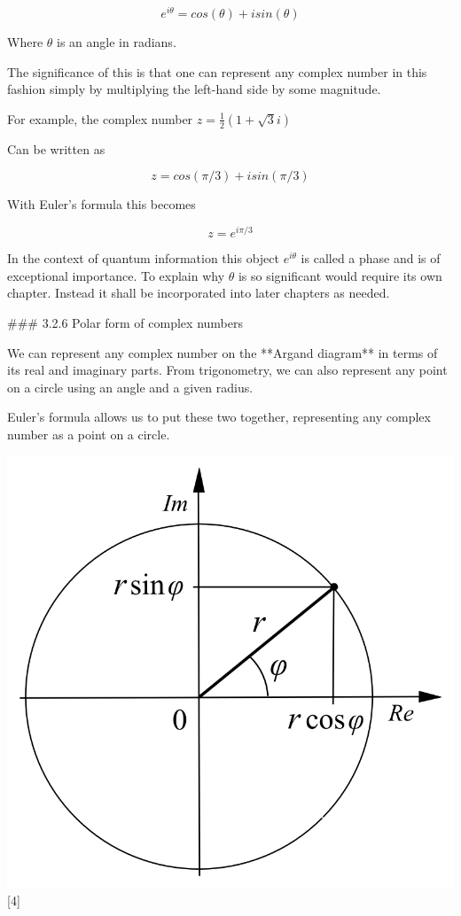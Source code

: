 \documentclass{book}
\begin{document}
$$ e^{i \theta} = cos(\theta) + i sin(\theta) $$

Where $\theta$ is an angle in radians. 

The significance of this is that one can represent any complex number in this fashion simply by multiplying the left-hand side by some magnitude. 

For example, the complex number $ z = \frac{1}{2}( 1 + \sqrt{3}i)$ 

Can be written as 

$$ z = cos(\pi/3) + i sin(\pi/3) $$

With Euler's formula this becomes 

$$ z = e^{i \pi/3} $$

In the context of quantum information this object $ e^{i\theta}$ is called a phase and is of exceptional importance. To explain why $\theta$ is so significant would require its own chapter. Instead it shall be incorporated into later chapters as needed.


### 3.2.6 Polar form of complex numbers 

We can represent any complex number on the **Argand diagram** in terms of its real and imaginary parts. From trigonometry, we can also represent any point on a circle using an angle and a given radius. 

Euler's formula allows us to put these two together, representing any complex number as a point on a circle. 

\includegraphics{images/Polar_Argand-diagram.png}
[4]
\end{document}

